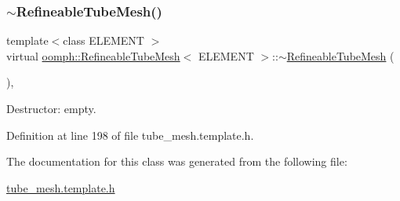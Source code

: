 \subsubsection{\texorpdfstring{$\sim$\+Refineable\+Tube\+Mesh()}{~RefineableTubeMesh()}}
{\footnotesize\ttfamily template$<$class E\+L\+E\+M\+E\+NT $>$ \\
virtual \hyperlink{classoomph_1_1RefineableTubeMesh}{oomph\+::\+Refineable\+Tube\+Mesh}$<$ E\+L\+E\+M\+E\+NT $>$\+::$\sim$\hyperlink{classoomph_1_1RefineableTubeMesh}{Refineable\+Tube\+Mesh} (\begin{DoxyParamCaption}{ }\end{DoxyParamCaption})\hspace{0.3cm}{\ttfamily [inline]}, {\ttfamily [virtual]}}



Destructor\+: empty. 



Definition at line 198 of file tube\+\_\+mesh.\+template.\+h.



The documentation for this class was generated from the following file\+:\begin{DoxyCompactItemize}
\item 
\hyperlink{tube__mesh_8template_8h}{tube\+\_\+mesh.\+template.\+h}\end{DoxyCompactItemize}
